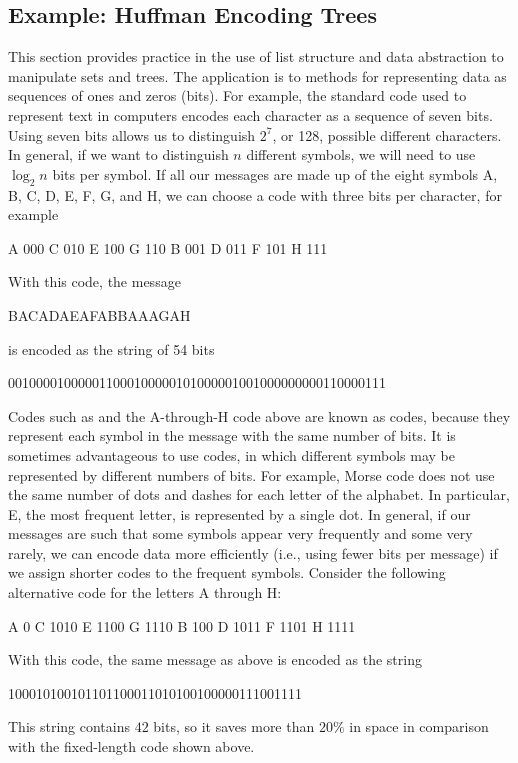 \subsection{Example: Huffman Encoding Trees}
\label{Section 2.3.4}

This section provides practice in the use of list structure and data abstraction to manipulate sets and trees.
The application is to methods for representing data as sequences of ones and zeros (bits).
For example, the  standard code used to represent text in computers encodes each character as a sequence of seven bits.
Using seven bits allows us to distinguish \( 2^7 \), or 128, possible different characters.
In general, if we want to distinguish \( n \) different symbols, we will need to use \( \log_2 n \) bits per symbol.
If all our messages are made up of the eight symbols A, B, C, D, E, F, G, and H, we can choose a code with three bits per character, for example
\begin{example}
	A 000    C 010    E 100    G 110
	B 001    D 011    F 101    H 111
\end{example}
With this code, the message
\begin{example}
	BACADAEAFABBAAAGAH
\end{example}
is encoded as the string of 54 bits
\begin{example}
	001000010000011000100000101000001001000000000110000111
\end{example}

Codes such as  and the A-through-H code above are known as  codes, because they represent each symbol in the message with the same number of bits.
It is sometimes advantageous to use  codes, in which different symbols may be represented by different numbers of bits.
For example, Morse code does not use the same number of dots and dashes for each letter of the alphabet.
In particular, E, the most frequent letter, is represented by a single dot.
In general, if our messages are such that some symbols appear very frequently and some very rarely, we can encode data more efficiently (i.e., using fewer bits per message) if we assign shorter codes to the frequent symbols.
Consider the following alternative code for the letters A through H:
\begin{example}
	A 0      C 1010    E 1100    G 1110
	B 100    D 1011    F 1101    H 1111
\end{example}
With this code, the same message as above is encoded as the string
\begin{example}
	100010100101101100011010100100000111001111
\end{example}
This string contains \( 42 \) bits, so it saves more than \( 20\% \) in space in comparison with the fixed-length code shown above.

